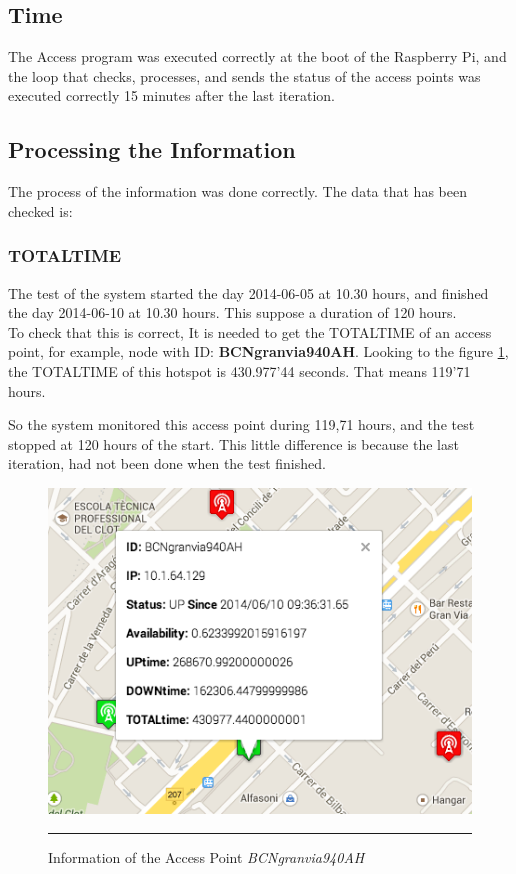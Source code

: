 \documentclass[12pt, a4paper,twoside]{tesi_upf}
\begin{document}
{    \subsection{Time}
The Access program was executed correctly at the boot of the Raspberry Pi, and the loop that checks, processes, and sends the status of the access points was executed correctly 15 minutes after the last iteration.

    \subsection{Processing the Information}
    
    The process of the information was done correctly. The data that has been checked is:
    
    \subsubsection{TOTALTIME}
    The test of the system started the day 2014-06-05 at 10.30 hours, and finished the day 2014-06-10 at 10.30 hours. This suppose a duration of 120 hours. \\
    
    To check that this is correct, It is needed to get the TOTALTIME of an access point, for example, node with ID: \textbf{BCNgranvia940AH}. Looking to the figure \ref{fig:gv}, the TOTALTIME of this hotspot is 430.977'44 seconds. That means 119'71 hours.
    
    So the system monitored this access point during 119,71 hours, and the test stopped at 120 hours of the start. This little difference is because the last iteration, had not been done when the test finished.
    
    
        \begin{figure}[H]
          \centering
              \includegraphics[scale=0.5]{./figures/granviastat.png}
              \rule{32em}{0.5pt}
            \caption[Information of the Access Point \emph{BCNgranvia940AH}]{Information of the Access Point \emph{BCNgranvia940AH}}
            \label{fig:gv}
        \end{figure}
    
}
\end{document}

